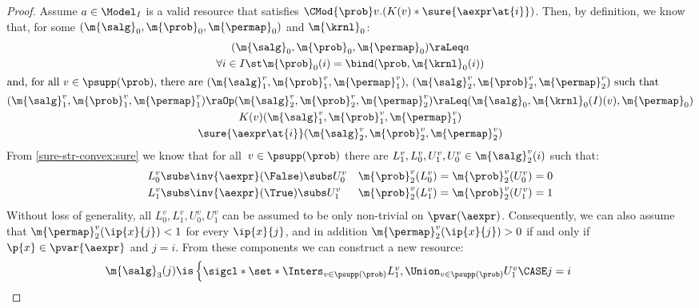 \begin{proof}
  Assume $a \in \Model_I$ is a valid resource that
  satisfies $\CMod{\prob} v. (K(v) \ast  \sure{\aexpr\at{i}})$.
  Then, by definition, we know that,
  for some $ (\m{\salg}_0, \m{\prob}_0, \m{\permap}_0) $ and $\m{\krnl}_0$:
  \begin{gather}
    (\m{\salg}_0, \m{\prob}_0, \m{\permap}_0) \raLeq a
    \label{sure-str-convex:a}
    \\
    \forall i\in I\st
       \m{\prob}_0(i) = \bind(\prob, \m{\krnl}_0(i))
    \label{sure-str-convex:bind-a}
    \\
    \intertext{and, for all $v \in \psupp(\prob)$, there are
      $(\m{\salg}^v_1, \m{\prob}^v_1, \m{\permap}^v_1)$,
      $(\m{\salg}^v_2, \m{\prob}^v_2, \m{\permap}^v_2)$
      such that}
(\m{\salg}^v_1, \m{\prob}^v_1, \m{\permap}^v_1)
    \raOp
    (\m{\salg}^v_2, \m{\prob}^v_2, \m{\permap}^v_2)
    \raLeq
      (\m{\salg}_0, \m{\krnl}_0(I)(v), \m{\permap}_0)
    \label{sure-str-convex:star}
    \\
    K(v)(\m{\salg}^v_1, \m{\prob}^v_1, \m{\permap}^v_1)
    \label{sure-str-convex:K}
    \\
    \sure{\aexpr\at{i}}(\m{\salg}^v_2, \m{\prob}^v_2, \m{\permap}^v_2)
    \label{sure-str-convex:sure}
  \end{gather}
  From \eqref{sure-str-convex:sure} we know that for all~$v \in \psupp(\prob)$
  there are $L^v_1,L^v_0,U^v_1,U^v_0 \in \m{\salg}^v_2(i)$ such that:
  \begin{align*}
    L^v_0 &\subs \inv{\aexpr}(\False) \subs U^v_0
    &
    \m{\prob}^v_2(L^v_0) &= \m{\prob}^v_2(U^v_0) = 0
    \\
    L^v_1 &\subs \inv{\aexpr}(\True) \subs U^v_1
    &
    \m{\prob}^v_2(L^v_1) &= \m{\prob}^v_2(U^v_1) = 1
  \end{align*}
  Without loss of generality, all $L^v_0, L^v_1, U^v_0, U^v_1$ can be assumed
  to be only non-trivial on $\pvar(\aexpr)$.
  Consequently, we can also assume that
  $\m{\permap}^v_2(\ip{x}{j})<1$ for every $\ip{x}{j}$,
and in addition
  $\m{\permap}^v_2(\ip{x}{j})>0$
  if and only if $\p{x}\in \pvar{\aexpr}$ and $j=i$.
  From these components we can construct a new resource:
  \begin{align*}
    \m{\salg}_3(j) &\is
      \begin{cases}
        \sigcl*{\set*{
          \Inters_{v \in \psupp(\prob)} L^v_1,
          \Union_{v \in \psupp(\prob)} U^v_1
        }}
        \CASE j  =  i \\

\end{cases}
\end{align*}
\end{proof}
